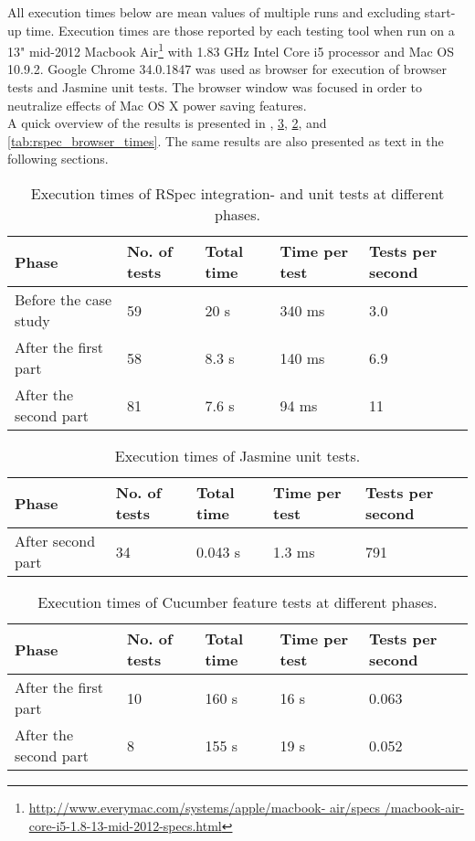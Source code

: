 \label{sec:results_time}

All execution times below are mean values of multiple runs and excluding
start-up time. Execution times are those reported by each testing tool
when run on a 13" mid-2012 Macbook
Air\footnote{\url{http://www.everymac.com/systems/apple/macbook-
air/specs /macbook-air-core-i5-1.8-13-mid-2012-specs.html}} with 1.83
GHz Intel Core i5 processor and Mac OS 10.9.2. Google Chrome 34.0.1847
was used as browser for execution of browser tests and Jasmine unit
tests. The browser window was focused in order to neutralize effects of
Mac OS X power saving features.\\

A quick overview of the results is presented in ,
\ref{tab:cucumber_times}, \ref{tab:jasmine_times}, and
\ref{tab:rspec_browser_times}. The same results are also presented as
text in the following sections.\\

\begin{table}[t]
    \centering
    \begin{tabular}{l l l l l}
        Phase & No. of tests & Total time & Time per test & Tests per second\\
        \hline
        Before the case study & 59 & 20 s & 340 ms & 3.0 \\
        After the first part  & 58 & 8.3 s  & 140 ms & 6.9 \\
        After the second part & 81 & 7.6 s  & 94 ms & 11\\
    \end{tabular}
    \caption{ Execution times of RSpec integration- and unit tests at different phases. }
    \label{tab:unit_times}
\end{table}

\begin{table}[t]
    \centering
    \begin{tabular}{l l l l l}
        Phase & No. of tests & Total time & Time per test & Tests per second \\
        \hline
        After second part & 34 &  0.043 s & 1.3 ms & 791\\
    \end{tabular}
    \caption{ Execution times of Jasmine unit tests. }
    \label{tab:jasmine_times}
\end{table}

\begin{table}[t]
    \centering
    \begin{tabular}{l l l l l}
        Phase & No. of tests & Total time & Time per test & Tests per second \\
        \hline
        After the first part  & 10 & 160 s & 16 s & 0.063\\
        After the second part & 8 &  155 s & 19 s & 0.052\\
    \end{tabular}
    \caption{ Execution times of Cucumber feature tests at different phases. }
    \label{tab:cucumber_times}
\end{table}

